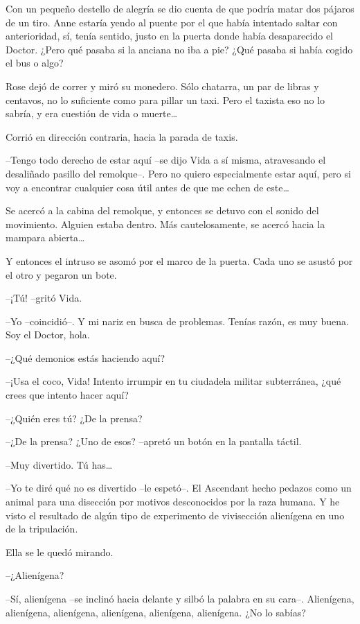 {Con un pequeño destello de alegría se dio cuenta de que podría matar
 dos pájaros de un tiro. Anne estaría yendo al puente por el que había
 intentado saltar con anterioridad, sí, tenía sentido, justo en la puerta
 donde había desaparecido el Doctor. ¿Pero qué pasaba si la anciana no
iba a pie? ¿Qué pasaba si había cogido el bus o algo?}

{Rose dejó de correr y miró su monedero. Sólo chatarra, un par de libras
 y centavos, no lo suficiente como para pillar un taxi. Pero el taxista
 eso no lo sabría, y era cuestión de vida o muerte\ldots{}}

{Corrió en dirección contraria, hacia la parada de taxis.}

\mbox{}

{--Tengo todo derecho de estar aquí --se dijo Vida a sí misma,
 atravesando el desaliñado pasillo del remolque--. Pero no quiero
 especialmente estar aquí, pero si voy a encontrar cualquier cosa útil
 antes de que me echen de este\ldots{}}

{Se acercó a la cabina del remolque, y entonces se detuvo con el sonido
 del movimiento. Alguien estaba dentro. Más cautelosamente, se acercó
 hacia la mampara abierta\ldots{}}

{Y entonces el intruso se asomó por el marco de la puerta. Cada uno se
asustó por el otro y pegaron un bote.}

{--¡Tú! --gritó Vida.}

{--Yo --coincidió--. Y mi nariz en busca de problemas. Tenías razón, es
muy buena. Soy el Doctor, hola.}

{--¿Qué demonios estás haciendo aquí?}

{--¡Usa el coco, Vida! Intento irrumpir en tu ciudadela militar
subterránea, ¿qué crees que intento hacer aquí?}

{--¿Quién eres tú? ¿De la prensa?}

{--¿De la prensa? ¿Uno de esos? --apretó un botón en la pantalla
táctil.}

{--Muy divertido. Tú has\ldots{}}

{--Yo te diré qué no es divertido --le espetó--. El Ascendant hecho
 pedazos como un animal para una disección por motivos desconocidos por
 la raza humana. Y he visto el resultado de algún tipo de experimento de
vivisección alienígena en uno de la tripulación.}

{Ella se le quedó mirando.}

{--¿Alienígena?}

{--Sí, alienígena --se inclinó hacia delante y silbó la palabra en su
 cara--. Alienígena, alienígena, alienígena, alienígena, alienígena,
alienígena. ¿No lo sabías?}

